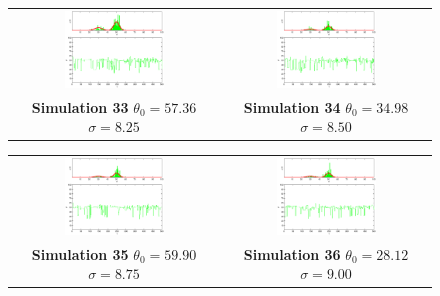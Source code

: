 \begin{figure}\label{fig: SimulationMetropolis4}
\begin{tabular}{cc} 
\includegraphics[width=0.5\textwidth]{ImaginiLatex/MetropolisExample33.eps} &
\includegraphics[width=0.5\textwidth]{ImaginiLatex/MetropolisExample34.eps} \\
\textbf{Simulation 33} $\theta_0=   57.36$  $\sigma=    8.25$  & \textbf{Simulation 34} $\theta_0=   34.98$  $\sigma=    8.50$
\end{tabular}
\begin{tabular}{cc} 
\includegraphics[width=0.5\textwidth]{ImaginiLatex/MetropolisExample35.eps} &
\includegraphics[width=0.5\textwidth]{ImaginiLatex/MetropolisExample36.eps} \\
\textbf{Simulation 35} $\theta_0=   59.90$  $\sigma=    8.75$  & \textbf{Simulation 36} $\theta_0=   28.12$  $\sigma=    9.00$
\end{tabular}
\end{figure}
